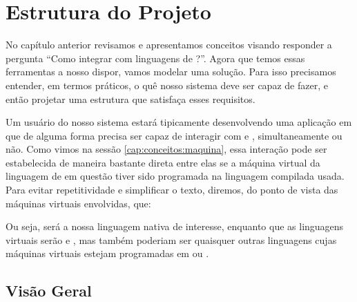 \chapter{Estrutura do Projeto}
\label{sec:estrutura}

\setcounter{defcnt}{0}

  No capítulo anterior revisamos e apresentamos conceitos visando responder a
  pergunta ``Como integrar \CXX{} com linguagens de \script{}?''. Agora que
  temos essas ferramentas a nosso dispor, vamos modelar uma solução. Para isso
  precisamos entender, em termos práticos, o quê nosso sistema deve ser capaz
  de fazer, e então projetar uma estrutura que satisfaça esses requisitos.
  
  Um usuário do nosso sistema estará tipicamente desenvolvendo uma aplicação
  em \CXX{} que de alguma forma precisa ser capaz de interagir com 
  e , simultaneamente ou não. Como vimos na sessão
  \ref{cap:conceitos:maquina}, essa interação pode ser estabelecida de maneira
  bastante direta entre elas se a máquina virtual da linguagem de \script{} em
  questão tiver sido programada na linguagem compilada usada. Para evitar
  repetitividade e simplificar o texto, diremos, do ponto de vista das
  máquinas virtuais envolvidas, que:


  Ou seja, \CXX{} será a nossa linguagem nativa de interesse, enquanto que
  as linguagens virtuais serão  e , mas também poderiam
  ser quaisquer outras linguagens cujas máquinas virtuais estejam programadas em
  \C{} ou \CXX{}.

  \section{Visão Geral}
  \label{sec:estrutura:geral}

